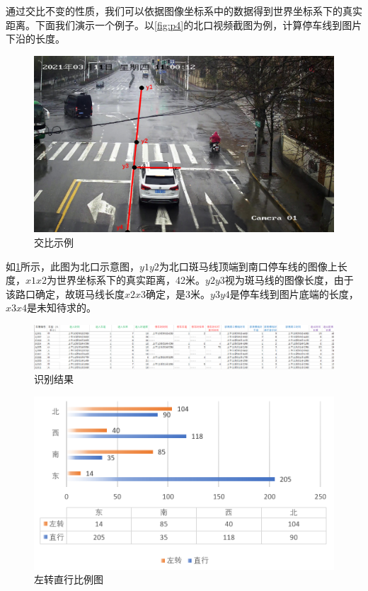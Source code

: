 通过交比不变的性质，我们可以依据图像坐标系中的数据得到世界坐标系下的真实距离。下面我们演示一个例子。以\ref{fig:p4}的北口视频截图为例，计算停车线到图片下沿的长度。

\begin{figure}[H]
    \centering
    \includegraphics[scale=0.5]{figures/交比示例.png}
    \caption{交比示例}
    \label{fig:交比}
\end{figure}

如\ref{fig:交比}所示，此图为北口示意图，$y1y2$为北口斑马线顶端到南口停车线的图像上长度，$x1x2$为世界坐标系下的真实距离，42米。$y2y3$视为斑马线的图像长度，由于该路口确定，故斑马线长度$x2x3$确定，是3米。$y3y4$是停车线到图片底端的长度，$x3x4$是未知待求的。

\begin{figure}[h]
    \centering
    \includegraphics[scale=0.5]{figures/识别结果.png}
    \caption{识别结果}
    \label{fig：识别结果}
\end{figure}

\begin{figure}[h]
    \centering
    \includegraphics[scale=0.5]{figures/左转直行比例图.png}
    \caption{左转直行比例图}
    \label{fig：左转直行比例图}
\end{figure}

